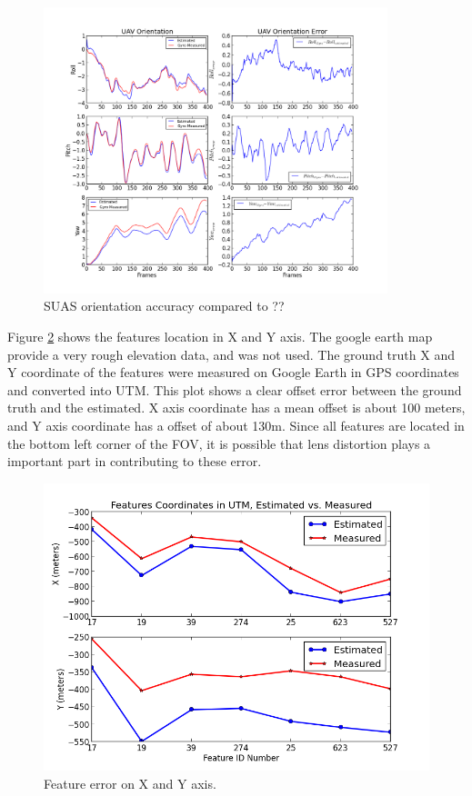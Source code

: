 \begin{figure}[h]
\centering
\includegraphics[width=10cm, keepaspectratio=true]
{./Figures/fltfig/airport/UAV_orientation_and_error.png}
\caption{SUAS orientation accuracy compared to ??}
\label{fltfig:14}
\end{figure}
\FloatBarrier

Figure \ref{fltfig:15} shows the features location in X and Y axis.
The google earth map provide a very rough elevation data, and was not
used. The ground truth X and Y coordinate of the features were
measured on Google Earth in GPS coordinates and converted into UTM.
This plot shows a clear offset error between the ground truth and the
estimated. X axis coordinate has a mean offset is about 100 meters,
and Y axis coordinate has a offset of about 130m. Since all features
are located in the bottom left corner of the FOV, it is possible that
lens distortion plays a important part in contributing to these error. 


\begin{figure}[h]
\centering
\includegraphics[width=13cm, keepaspectratio=true]
{./Figures/fltfig/airport/Feature_plot_(x,y).png}
\caption{Feature error on X and Y axis. }
\label{fltfig:15}
\end{figure}

